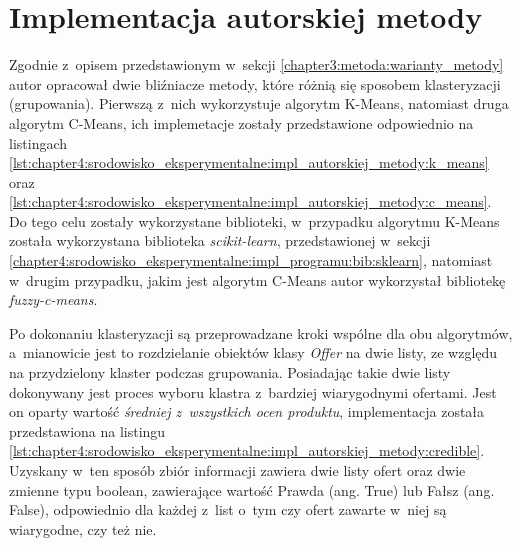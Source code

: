 \documentclass[../Kamil_Kowalewski_Main.tex]{subfiles}
\begin{document}
{    \section{Implementacja autorskiej metody}
    \label{chapter4:srodowisko_eksperymentalne:impl_autorskiej_metody} {
        Zgodnie z~opisem przedstawionym w~sekcji \ref{chapter3:metoda:warianty_metody}
        autor opracował dwie bliźniacze metody, które różnią się sposobem
        klasteryzacji (grupowania). Pierwszą z~nich wykorzystuje algorytm K-Means,
        natomiast druga algorytm C-Means, ich implemetacje zostały przedstawione
        odpowiednio na listingach
        \ref{lst:chapter4:srodowisko_eksperymentalne:impl_autorskiej_metody:k_means}
        oraz
        \ref{lst:chapter4:srodowisko_eksperymentalne:impl_autorskiej_metody:c_means}.
        Do tego celu zostały wykorzystane biblioteki, w~przypadku algorytmu
        K-Means została wykorzystana biblioteka \textit{scikit-learn}, przedstawionej
        w~sekcji \ref{chapter4:srodowisko_eksperymentalne:impl_programu:bib:sklearn},
        natomiast w~drugim przypadku, jakim jest algorytm C-Means autor wykorzystał
        bibliotekę \textit{fuzzy-c-means}\cite{website:cmeans}.



        Po dokonaniu klasteryzacji są przeprowadzane kroki wspólne dla obu algorytmów,
        a~mianowicie jest to rozdzielanie obiektów klasy \textit{Offer} na dwie listy,
        ze względu na przydzielony klaster podczas grupowania. Posiadając takie dwie
        listy dokonywany jest proces wyboru klastra z~bardziej wiarygodnymi ofertami.
        Jest on oparty wartość \textit{średniej z~wszystkich ocen produktu},
        implementacja została przedstawiona na listingu
        \ref{lst:chapter4:srodowisko_eksperymentalne:impl_autorskiej_metody:credible}.
        Uzyskany w~ten sposób zbiór informacji zawiera dwie listy ofert oraz dwie
        zmienne typu boolean, zawierające wartość Prawda (ang. True) lub Fałsz (ang.
        False), odpowiednio dla każdej z~list o~tym czy ofert zawarte w~niej są
        wiarygodne, czy też nie.

}}
\end{document}
